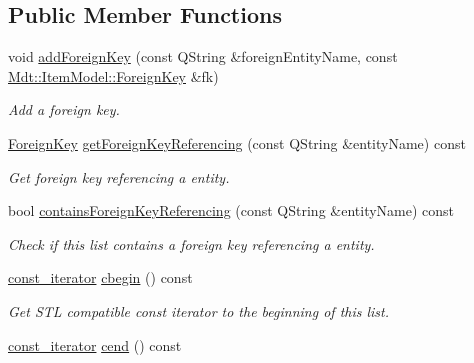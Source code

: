 \subsection*{Public Member Functions}
\begin{DoxyCompactItemize}
\item 
void \hyperlink{class_mdt_1_1_item_model_1_1_foreign_key_list_a9d17e99065f9b08bf6073ef2f0915285}{add\+Foreign\+Key} (const Q\+String \&foreign\+Entity\+Name, const \hyperlink{class_mdt_1_1_item_model_1_1_foreign_key}{Mdt\+::\+Item\+Model\+::\+Foreign\+Key} \&fk)
\begin{DoxyCompactList}\small\item\em Add a foreign key. \end{DoxyCompactList}\item 
\hyperlink{class_mdt_1_1_item_model_1_1_foreign_key}{Foreign\+Key} \hyperlink{class_mdt_1_1_item_model_1_1_foreign_key_list_adbc2bf63455f765488e8e3872ea5807f}{get\+Foreign\+Key\+Referencing} (const Q\+String \&entity\+Name) const 
\begin{DoxyCompactList}\small\item\em Get foreign key referencing a entity. \end{DoxyCompactList}\item 
bool \hyperlink{class_mdt_1_1_item_model_1_1_foreign_key_list_ab0112cf7bcffec4b67dfa8b9cc429bd5}{contains\+Foreign\+Key\+Referencing} (const Q\+String \&entity\+Name) const 
\begin{DoxyCompactList}\small\item\em Check if this list contains a foreign key referencing a entity. \end{DoxyCompactList}\item 
\hyperlink{class_mdt_1_1_item_model_1_1_foreign_key_list_a3c761b1204692763e403333043701b6a}{const\+\_\+iterator} \hyperlink{class_mdt_1_1_item_model_1_1_foreign_key_list_a78bfb386570945efc50e5046fba4685e}{cbegin} () const \hypertarget{class_mdt_1_1_item_model_1_1_foreign_key_list_a78bfb386570945efc50e5046fba4685e}{}\label{class_mdt_1_1_item_model_1_1_foreign_key_list_a78bfb386570945efc50e5046fba4685e}

\begin{DoxyCompactList}\small\item\em Get S\+TL compatible const iterator to the beginning of this list. \end{DoxyCompactList}\item 
\hyperlink{class_mdt_1_1_item_model_1_1_foreign_key_list_a3c761b1204692763e403333043701b6a}{const\+\_\+iterator} \hyperlink{class_mdt_1_1_item_model_1_1_foreign_key_list_a13f7f03ea7335d8a06ffd6447f7fb2d0}{cend} () const \hypertarget{class_mdt_1_1_item_model_1_1_foreign_key_list_a13f7f03ea7335d8a06ffd6447f7fb2d0}{}\label{class_mdt_1_1_item_model_1_1_foreign_key_list_a13f7f03ea7335d8a06ffd6447f7fb2d0}


\end{DoxyCompactItemize}
